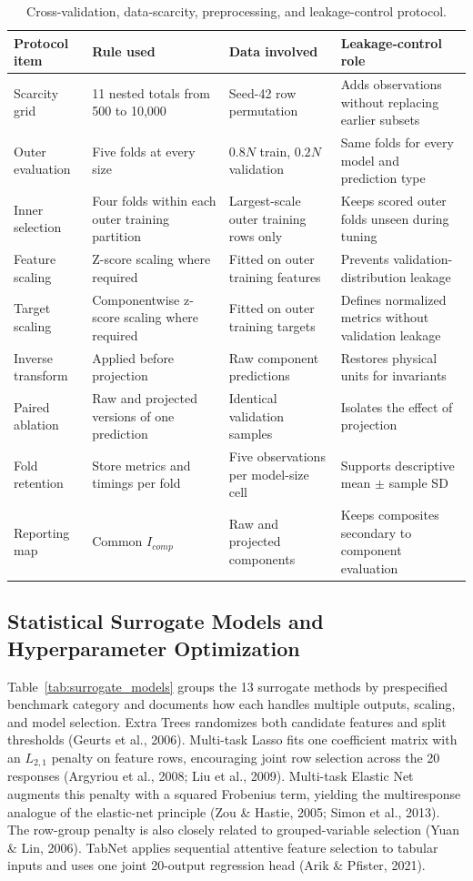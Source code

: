\documentclass[a4paper,fleqn]{cas-sc}
\begin{document}
\begin{table}[htbp]
\centering
\caption{Cross-validation, data-scarcity, preprocessing, and leakage-control protocol.}
\label{tab:data_protocol}
\scriptsize
\setlength{\tabcolsep}{3pt}
\begin{tabular}{p{2.6cm}p{3.1cm}p{3.0cm}p{3.1cm}}
\hline
Protocol item & Rule used & Data involved & Leakage-control role \\
\hline
Scarcity grid & 11 nested totals from 500 to 10,000 & Seed-42 row permutation & Adds observations without replacing earlier subsets \\
Outer evaluation & Five folds at every size & $0.8N$ train, $0.2N$ validation & Same folds for every model and prediction type \\
Inner selection & Four folds within each outer training partition & Largest-scale outer training rows only & Keeps scored outer folds unseen during tuning \\
Feature scaling & Z-score scaling where required & Fitted on outer training features & Prevents validation-distribution leakage \\
Target scaling & Componentwise z-score scaling where required & Fitted on outer training targets & Defines normalized metrics without validation leakage \\
Inverse transform & Applied before projection & Raw component predictions & Restores physical units for invariants \\
Paired ablation & Raw and projected versions of one prediction & Identical validation samples & Isolates the effect of projection \\
Fold retention & Store metrics and timings per fold & Five observations per model-size cell & Supports descriptive mean $\pm$ sample SD \\
Reporting map & Common $I_{comp}$ & Raw and projected components & Keeps composites secondary to component evaluation \\
\hline
\end{tabular}
\end{table}

\subsection{Statistical Surrogate Models and Hyperparameter Optimization}

Table~\ref{tab:surrogate_models} groups the 13 surrogate methods by prespecified benchmark category and documents how each handles multiple outputs, scaling, and model selection. Extra Trees randomizes both candidate features and split thresholds (Geurts et al., 2006). Multi-task Lasso fits one coefficient matrix with an $L_{2,1}$ penalty on feature rows, encouraging joint row selection across the 20 responses (Argyriou et al., 2008; Liu et al., 2009). Multi-task Elastic Net augments this penalty with a squared Frobenius term, yielding the multiresponse analogue of the elastic-net principle (Zou \& Hastie, 2005; Simon et al., 2013). The row-group penalty is also closely related to grouped-variable selection (Yuan \& Lin, 2006). TabNet applies sequential attentive feature selection to tabular inputs and uses one joint 20-output regression head (Arik \& Pfister, 2021).
\end{document}
